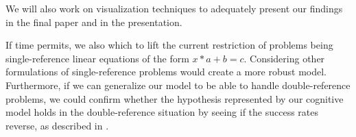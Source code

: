 \documentclass[10pt,letterpaper]{article}
\begin{document}
We will also work on visualization techniques to adequately present our findings in the final paper and in the presentation.

If time permits, we also which to lift the current restriction of problems being single-reference linear equations of the form $x*a+b=c$. Considering other formulations of single-reference problems would create a more robust model. Furthermore, if we can generalize our model to be able to handle double-reference problems, we could confirm whether the hypothesis represented by our cognitive model holds in the double-reference situation by seeing if the success rates reverse, as described in \cite{KoedNath2008}.

%
%
%



%
%
\end{document}
